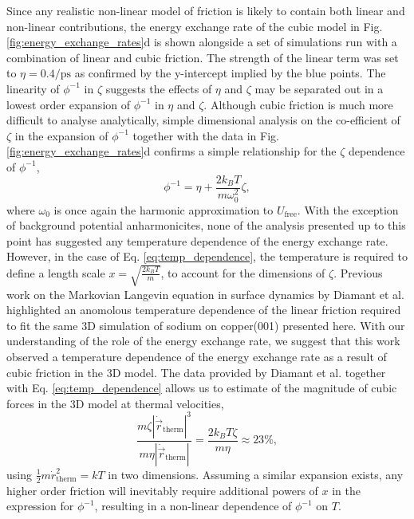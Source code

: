 \documentclass[7pt]{article}
\newcommand{\ips}{\si{\per\pico\second}}
\begin{document}
Since any realistic non-linear model of friction is likely to contain both linear and non-linear contributions, the energy exchange rate of the cubic model in Fig. \ref{fig:energy_exchange_rates}d is shown alongside a set of simulations run with a combination of linear and cubic friction. The strength of the linear term was set to $\eta=0.4\ips$ as confirmed by the y-intercept implied by the blue points. The linearity of $\phi^{-1}$ in $\zeta$ suggests the effects of $\eta$ and $\zeta$ may be separated out in a lowest order expansion of $\phi^{-1}$ in $\eta$ and $\zeta$. Although cubic friction is much more difficult to analyse analytically, simple dimensional analysis on the co-efficient of $\zeta$ in the expansion of $\phi^{-1}$ together with the data in Fig. \ref{fig:energy_exchange_rates}d confirms a simple relationship for the $\zeta$ dependence of $\phi^{-1}$,
\begin{equation}
	\phi^{-1} = \eta + \frac{2k_BT}{m\omega_0^2}\zeta,
	\label{eq:temp_dependence}
\end{equation}
where $\omega_0$ is once again the harmonic approximation to $U_{\text{free}}$. With the exception of background potential anharmonicites, none of the analysis presented up to this point has suggested any temperature dependence of the energy exchange rate. However, in the case of Eq. \ref{eq:temp_dependence}, the temperature is required to define a length scale $x=\sqrt{\frac{2k_BT}{m}}$, to account for the dimensions of $\zeta$. Previous work on the Markovian Langevin equation in surface dynamics by Diamant et al. highlighted an anomolous temperature dependence of the linear friction required to fit the same 3D simulation of sodium on copper(001) presented here\cite{Diamant}. With our understanding of the role of the energy exchange rate, we suggest that this work observed a temperature dependence of the energy exchange rate as a result of cubic friction in the 3D model. The data provided by Diamant et al. together with Eq. \ref{eq:temp_dependence} allows us to estimate of the magnitude of cubic forces in the 3D model at thermal velocities,
\begin{equation}
	\frac{m\zeta\left|\dot{\vec{r}}_\text{therm}\right|^3}{m\eta\left|\dot{\vec{r}}_\text{therm}\right|} = \frac{2k_BT\zeta}{m\eta} \approx 23\%,
\end{equation}
using $\frac{1}{2}m\dot{r}_\text{therm}^2=kT$ in two dimensions. Assuming a similar expansion exists, any higher order friction will inevitably require additional powers of $x$ in the expression for $\phi^{-1}$, resulting in a non-linear dependence of $\phi^{-1}$ on $T$. 
\end{document}
